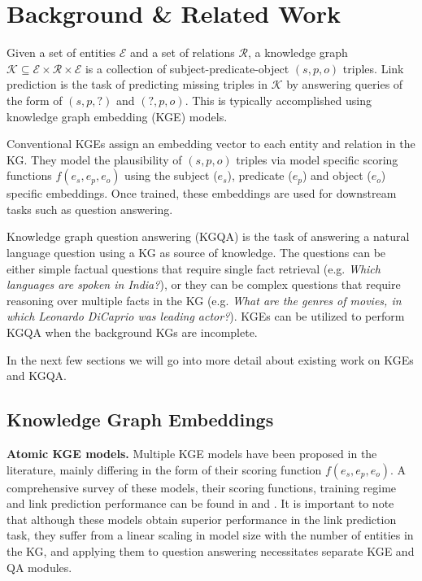 \documentclass[11pt]{article}
\renewcommand\:{\colon} \newcommand{\sset}[1]{\left\{\,#1\,\right\}} \newcommand{\ssets}[1]{\left\{#1\right\}} \newcommand{\ssetn}[1]{\{\,#1\,\}}
\newcommand\cE{\mathcal{E}}
\newcommand\cK{\mathcal{K}}
\newcommand\cR{\mathcal{R}}
\begin{document}
\section{Background \& Related Work}
\label{sec:related_work}
Given a set of entities $\cE$ and a set of relations $\cR$, a knowledge graph $\cK \subseteq \cE \times \cR \times \cE$ is a collection of subject-predicate-object $(s,p,o)$ triples.
Link prediction is the task of predicting missing triples in $\cK$ by answering queries of the form of $(s,p,?)$ and $(?,p,o)$. This is typically accomplished using knowledge graph embedding (KGE) models.

Conventional KGEs assign an embedding vector to each entity and relation in the KG. They model the plausibility of $(s,p,o)$ triples via model specific scoring functions $f(e_s, e_p, e_o)$ using the subject ($e_s$), predicate ($e_p$) and object ($e_o$) specific embeddings.
Once trained, these embeddings are used for downstream tasks such as question answering.




Knowledge graph question answering (KGQA) is the task of answering a natural language question using a KG as source of knowledge. 
The questions can be either simple factual questions that require single fact retrieval 
(e.g. \textit{Which languages are spoken in India?}), 
or they can be complex questions that require reasoning over multiple facts in the KG 
(e.g. \textit{What are the genres of movies, in which Leonardo DiCaprio was leading actor?}).
KGEs can be utilized to perform KGQA when the background KGs are incomplete.


In the next few sections we will go into more detail about existing work on KGEs and KGQA.

\subsection{Knowledge Graph Embeddings}
\label{sec:kge}

\textbf{Atomic KGE models.} 
Multiple KGE models have been proposed in the literature, mainly differing in the form of their scoring function $f(e_s, e_p, e_o)$. A comprehensive survey of these models, their scoring functions, training regime and link prediction performance can be found in \citet{kge_survey} and \citet{ruffinelli2020you}.
It is important to note that although these models obtain superior performance in the link prediction task, they suffer from a linear scaling in model size with the number of entities in the KG, and applying them to question answering necessitates separate KGE and QA modules.
\end{document}
